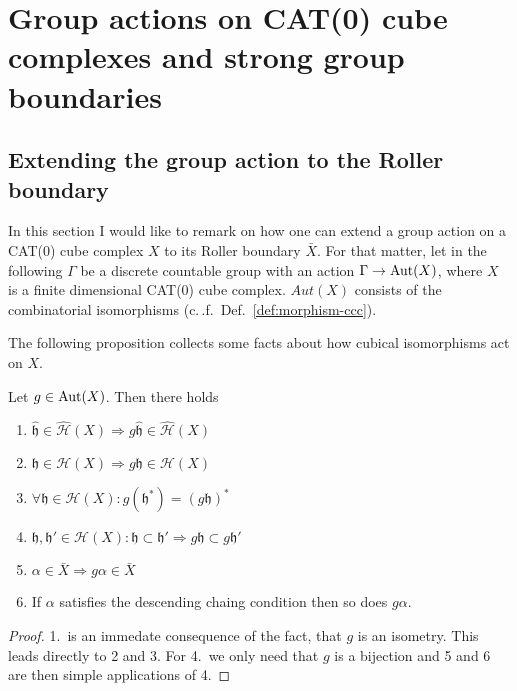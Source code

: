 \section{Group actions on CAT(0) cube complexes and strong group boundaries}
\label{sec:group}

\subsection{Extending the group action to the Roller boundary}
\label{sec:ga-roller}

In this section I would like to remark on how one can extend a group action on a CAT(0) cube complex \(X\) to its Roller boundary \(\bar X\). For that matter, let in the following \(\Gamma\) be a discrete countable group with an action \(\Gamma \to \operatorname{Aut}(X)\), where \(X\) is a finite dimensional CAT(0) cube complex. \(Aut(X)\) consists of the combinatorial isomorphisms (c.\,.f.\ Def.~\ref{def:morphism-ccc}).

The following proposition collects some facts about how cubical isomorphisms act on \(X\).

\begin{prop}
  Let \(g \in \operatorname{Aut}(X)\). Then there holds
  \begin{enumerate}
  \item \(\mathfrak{\hat h} \in \mathcal{\hat H}(X) \Rightarrow  g\mathfrak{\hat h} \in \mathcal{\hat H}(X)\)
  \item \(\mathfrak{h} \in \mathcal{H}(X) \Rightarrow  g\mathfrak{h} \in \mathcal{H}(X)\)
  \item \(\forall \mathfrak{h} \in \mathcal{H}(X)\colon g(\mathfrak{h}^\ast) = (g\mathfrak{h})^\ast\)
  \item \(\mathfrak{h,h'} \in \mathcal{H}(X)\colon \mathfrak{h} \subset \mathfrak{h'} \Rightarrow g\mathfrak{h} \subset g\mathfrak{h'}\)
  \item \(\alpha \in \bar X \Rightarrow g\alpha \in \bar X\)
  \item If \(\alpha\) satisfies the descending chaing condition then so does \(g\alpha\).
  \end{enumerate}
\end{prop}

\begin{proof}
  1.\ is an immedate consequence of the fact, that \(g\) is an isometry. This leads directly to 2 and 3. For 4.\ we only need that \(g\) is a bijection and 5 and 6 are then simple applications of 4.
\end{proof}

